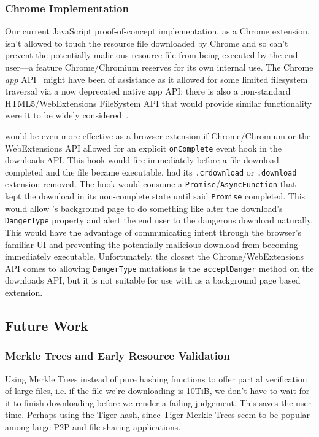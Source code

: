 \subsubsection{Chrome Implementation}

Our current JavaScript proof-of-concept implementation, as a Chrome extension,
isn't allowed to touch the resource file downloaded by Chrome and so can't
prevent the potentially-malicious resource file from being executed by the end
user---a feature Chrome/Chromium reserves for its own internal use. The Chrome
\textit{app} API~\cite{AppAPI} might have been of assistance as it allowed for
some limited filesystem traversal via a now deprecated native app API; there is
also a non-standard HTML5/WebExtensions FileSystem API that would provide
similar functionality were it to be widely considered~\cite{deadSpec}.

\SYSTEM{} would be even more effective as a browser extension if Chrome/Chromium
or the WebExtensions API allowed for an explicit \texttt{onComplete} event hook
in the downloads API. This hook would fire immediately before a file download
completed and the file became executable, \ie had its \texttt{.crdownload} or
\texttt{.download} extension removed. The hook would consume a
\texttt{Promise}/\texttt{AsyncFunction} that kept the download in its
non-complete state until said \texttt{Promise} completed. This would allow
\SYSTEM{}'s background page to do something like alter the download's
\texttt{DangerType} property and alert the end user to the dangerous download
naturally. This would have the advantage of communicating intent through the
browser's familiar UI and preventing the potentially-malicious download from
becoming immediately executable. Unfortunately, the closest the
Chrome/WebExtensions API comes to allowing \texttt{DangerType} mutations is the
\texttt{acceptDanger} method on the downloads API, but it is not suitable for
use with \SYSTEM{} as a background page based extension.

\subsection{Future Work}

\subsubsection{Merkle Trees and Early Resource Validation}

Using Merkle Trees instead of pure hashing functions to offer partial
verification of large files, i.e. if the file we're downloading is 10TiB, we
don't have to wait for it to finish downloading before we render a failing
judgement. This saves the user time. Perhaps using the Tiger hash, since Tiger
Merkle Trees seem to be popular among large P2P and file sharing applications.

